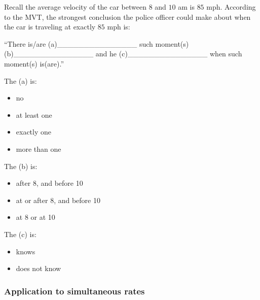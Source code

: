 \documentclass[pdftex, brazil, 12pt, twoside]{article}
\newcommand{\bolota}{\item[$\bigcirc$]}
\begin{document}
\begin{Exercise}[title={When 85 mph?}]
  \noindent Recall the average velocity of the car between $8$ and $10$ am is $85$ mph.
  According to the MVT, the strongest conclusion the police officer could make about when
  the car is traveling at exactly $85$ mph is:

  \noindent ``There is/are (a)\_\_\_\_\_\_\_\_\_\_\_\_\_\_\_ such moment(s) (b)\_\_\_\_\_\_\_\_\_\_\_\_\_\_\_
  and he (c)\_\_\_\_\_\_\_\_\_\_\_\_\_\_\_ when such moment(s) is(are).''

  \noindent The (a) is:
  \begin{itemize}[noitemsep]
    \bolota no
    \bolota at least one
    \bolota exactly one
    \bolota more than one
  \end{itemize}

  \noindent The (b) is:
  \begin{itemize}[noitemsep]
    \bolota after 8, and before 10
    \bolota at or after 8, and before 10
    \bolota at 8 or at 10
  \end{itemize}

  \noindent The (c) is:
  \begin{itemize}[noitemsep]
    \bolota knows
    \bolota does not know
  \end{itemize}
\end{Exercise}

\subsubsection{Application to simultaneous rates}
\label{u1-mvt-speed}













\end{document}
